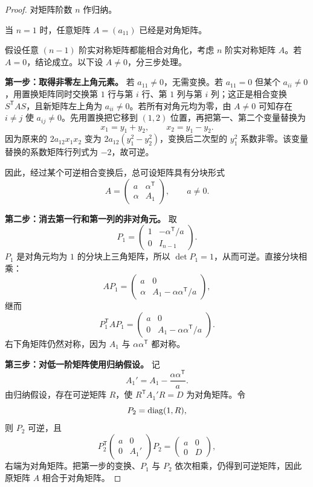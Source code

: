 \begin{proof}
对矩阵阶数 $n$ 作归纳。

当 $n=1$ 时，任意矩阵 $A=(a_{11})$ 已经是对角矩阵。

假设任意 $(n-1)$ 阶实对称矩阵都能相合对角化，考虑 $n$ 阶实对称矩阵 $A$。若 $A=0$，结论成立。以下设 $A\ne0$，分三步处理。

\textbf{第一步：取得非零左上角元素。} 若 $a_{11}\ne0$，无需变换。若 $a_{11}=0$ 但某个 $a_{ii}\ne0$，用置换矩阵同时交换第 $1$ 行与第 $i$ 行、第 $1$ 列与第 $i$ 列；这正是相合变换 $S^{\mathsf T}AS$，且新矩阵左上角为 $a_{ii}\ne0$。若所有对角元均为零，由 $A\ne0$ 可知存在 $i\ne j$ 使 $a_{ij}\ne0$。先用置换把它移到 $(1,2)$ 位置，再把第一、第二个变量替换为
\[
x_1=y_1+y_2,\qquad x_2=y_1-y_2.
\]
因为原来的 $2a_{12}x_1x_2$ 变为 $2a_{12}(y_1^2-y_2^2)$，变换后二次型的 $y_1^2$ 系数非零。该变量替换的系数矩阵行列式为 $-2$，故可逆。

因此，经过某个可逆相合变换后，总可设矩阵具有分块形式
\[
A=\begin{pmatrix}a&\alpha^{\mathsf T}\\\alpha&A_1\end{pmatrix},
\qquad a\ne0.
\]

\textbf{第二步：消去第一行和第一列的非对角元。} 取
\[
P_1=\begin{pmatrix}1&-\alpha^{\mathsf T}/a\\0&I_{n-1}\end{pmatrix}.
\]
$P_1$ 是对角元均为 $1$ 的分块上三角矩阵，所以 $\det P_1=1$，从而可逆。直接分块相乘：
\[
AP_1=
\begin{pmatrix}
a&0\\
\alpha&A_1-\alpha\alpha^{\mathsf T}/a
\end{pmatrix},
\]
继而
\[
P_1^{\mathsf T}AP_1=
\begin{pmatrix}
a&0\\
0&A_1-\alpha\alpha^{\mathsf T}/a
\end{pmatrix}.
\]
右下角矩阵仍然对称，因为 $A_1$ 与 $\alpha\alpha^{\mathsf T}$ 都对称。

\textbf{第三步：对低一阶矩阵使用归纳假设。} 记
\[
A_1'=A_1-\frac{\alpha\alpha^{\mathsf T}}a.
\]
由归纳假设，存在可逆矩阵 $R$，使 $R^{\mathsf T}A_1'R=D$ 为对角矩阵。令
\[
P_2=\operatorname{diag}(1,R),
\]
则 $P_2$ 可逆，且
\[
P_2^{\mathsf T}
\begin{pmatrix}a&0\\0&A_1'\end{pmatrix}
P_2
=\begin{pmatrix}a&0\\0&D\end{pmatrix},
\]
右端为对角矩阵。把第一步的变换、$P_1$ 与 $P_2$ 依次相乘，仍得到可逆矩阵，因此原矩阵 $A$ 相合于对角矩阵。
\end{proof}

